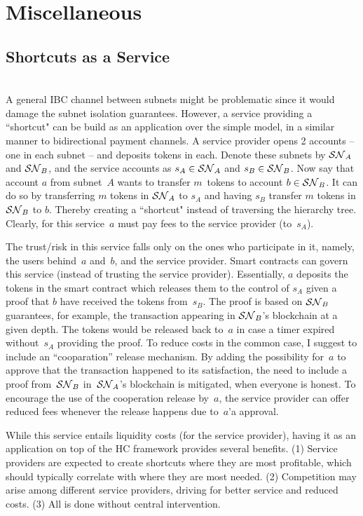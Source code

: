 \section{Miscellaneous}
\label{sec:misc}

\subsection{Shortcuts as a Service}
\\
A general IBC channel between subnets might be problematic since it would damage the subnet isolation guarantees. 
However, a service providing a ``shortcut" can be build as an application over the simple model, in a similar manner to bidirectional payment channels.
A service provider opens 2 accounts -- one in each subnet -- and deposits tokens in each. Denote these subnets by $\mathcal{SN}_A$ and $\mathcal{SN}_B$, and the service accounts as $s_A\in\mathcal{SN}_A$ and $s_B\in\mathcal{SN}_B$.
Now say that account $a$ from subnet~$A$ wants to transfer $m$~tokens to account $b\in\mathcal{SN}_B$. 
It can do so by transferring $m$ tokens in $\mathcal{SN}_A$ to $s_A$ and having $s_B$ transfer $m$ tokens in $\mathcal{SN}_B$ to $b$. Thereby creating a ``shortcut" instead of traversing the hierarchy tree.
Clearly, for this service~$a$ must pay fees to the service provider (to~$s_A$).

The trust/risk in this service falls only on the ones who participate in it, namely, the users behind~$a$ and~$b$, and the service provider.
Smart contracts can govern this service (instead of trusting the service provider).
Essentially, $a$ deposits the tokens in the smart contract which releases them to the control of $s_A$ given a proof that $b$ have received the tokens from~$s_B$.
The proof is based on $\mathcal{SN}_B$ guarantees, for example, the transaction appearing in $\mathcal{SN}_B$'s blockchain at a given depth.
The tokens would be released back to~$a$ in case a timer expired without~$s_A$ providing the proof.
To reduce costs in the common case, I suggest to include an ``cooparation'' release mechanism.
By adding the possibility for~$a$ to approve that the transaction happened to its satisfaction, the need to include a proof from~$\mathcal{SN}_B$ in~$\mathcal{SN}_A$'s blockchain is mitigated, when everyone is honest.
To encourage the use of the cooperation release by~$a$, the service provider can offer reduced fees whenever the release happens due to~$a$'a approval.

While this service entails liquidity costs (for the service provider), having it as an application on top of the HC framework provides several benefits.
(1) Service providers are expected to create shortcuts where they are most profitable, which should typically correlate with where they are most needed.
(2) Competition may arise among different service providers, driving for better service and reduced costs.
(3) All is done without central intervention.

